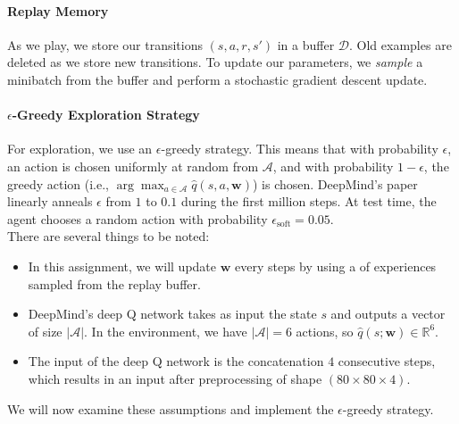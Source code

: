 \documentclass{article}
\begin{document}
\paragraph{Replay Memory}
As we play, we store our transitions $ (s, a, r, s') $ in a buffer $\mathcal{D}$. Old examples are deleted as we store new transitions. To update our parameters, we \emph{sample} a minibatch from the buffer and perform a stochastic gradient descent update.

\paragraph{$\epsilon$-Greedy Exploration Strategy}
For exploration, we use an $\epsilon$-greedy strategy.
This means that with probability $\epsilon$, an action is chosen uniformly at random from $\mathcal{A}$, and with probability $1-\epsilon$, the greedy action (i.e., $\arg\max_{a \in \mathcal{A}} \hat{q}(s,a,\mathbf{w})$) is chosen. DeepMind's paper \cite{mnih2015human} \cite{mnih-atari-2013} linearly anneals $ \epsilon $ from $1$ to $0.1$ during the first million steps. At test time, the agent chooses a random action with probability $\epsilon_{\text{soft}} = 0.05$.\\

There are several things to be noted:
\begin{itemize}
\item In this assignment, we will update $\mathbf{w}$ every  steps by using a  of experiences sampled from the replay buffer.

\item DeepMind's deep Q network takes as input the state $s$ and outputs a vector of size $|\mathcal{A}|$. In the  environment, we have $|\mathcal{A}| = 6$ actions, so $\hat{q}(s; \mathbf{w}) \in \mathbb{R}^{6}$.

\item The input of the deep Q network is the concatenation $4$ consecutive steps, which results in an input after preprocessing of shape $(80 \times 80 \times 4)$.
\end{itemize}

We will now examine these assumptions and implement the $\epsilon$-greedy strategy.
\end{document}
